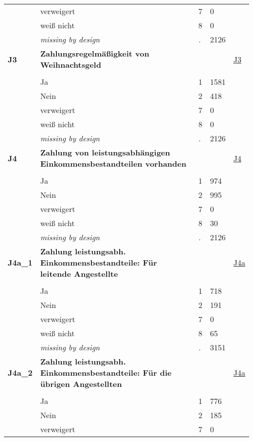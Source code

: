 \begin{longtable}{| L{2.65cm} | L{8cm} | C{1.5cm} | R{1.25cm} | C{2.25cm}  |}
   & verweigert & 7 & 0 &  \\ 
   & weiß nicht & 8 & 0 &  \\ 
   & \textit{missing by design} & \textit{.} & 2126 &  \\ 
   \midrule
\textbf{J3}\label{var:J3} & \textbf{Zahlungsregelmäßigkeit von Weihnachtsgeld} &  &  & \hyperref[J3]{J3} \\ 
   &  &  &  &  \\ 
   & Ja & 1 & 1581 &  \\ 
   & Nein & 2 & 418 &  \\ 
   & verweigert & 7 & 0 &  \\ 
   & weiß nicht & 8 & 0 &  \\ 
   & \textit{missing by design} & \textit{.} & 2126 &  \\ 
   \midrule
\textbf{J4}\label{var:J4} & \textbf{Zahlung von leistungsabhängigen Einkommensbestandteilen vorhanden} &  &  & \hyperref[J4]{J4} \\ 
   &  &  &  &  \\ 
   & Ja & 1 & 974 &  \\ 
   & Nein & 2 & 995 &  \\ 
   & verweigert & 7 & 0 &  \\ 
   & weiß nicht & 8 & 30 &  \\ 
   & \textit{missing by design} & \textit{.} & 2126 &  \\ 
   \midrule
\textbf{J4a\_1}\label{var:J4a:1} & \textbf{Zahlung leistungsabh. Einkommensbestandteile: Für leitende Angestellte} &  &  & \hyperref[J4a]{J4a} \\ 
   &  &  &  &  \\ 
   & Ja & 1 & 718 &  \\ 
   & Nein & 2 & 191 &  \\ 
   & verweigert & 7 & 0 &  \\ 
   & weiß nicht & 8 & 65 &  \\ 
   & \textit{missing by design} & \textit{.} & 3151 &  \\ 
   \midrule
\textbf{J4a\_2}\label{var:J4a:2} & \textbf{Zahlung leistungsabh. Einkommensbestandteile: Für die übrigen Angestellten} &  &  & \hyperref[J4a]{J4a} \\ 
   &  &  &  &  \\ 
   & Ja & 1 & 776 &  \\ 
   & Nein & 2 & 185 &  \\ 
   & verweigert & 7 & 0 &  \\ 

\end{longtable}
